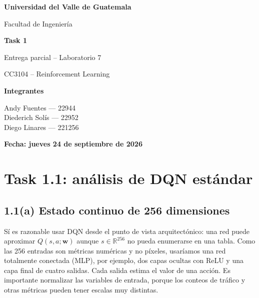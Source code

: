 \documentclass[11pt,a4paper]{article}
\newcommand{\integrantes}{Andy Fuentes --- 22944\\[0.2em]
Diederich Solís --- 22952\\[0.2em]
Diego Linares --- 221256}
\newcommand{\fechadeentrega}{jueves 24 de septiembre de 2026}
\begin{document}
\begin{titlepage}
\thispagestyle{empty}
\centering
\vspace*{2.3cm}
{\Large\bfseries Universidad del Valle de Guatemala\par}
\vspace{0.3cm}
{\large Facultad de Ingeniería\par}
\vspace{2.4cm}
{\Huge\bfseries Task 1\par}
\vspace{0.3cm}
{\Large Entrega parcial -- Laboratorio 7\par}
\vspace{0.45cm}
{\Large CC3104 -- Reinforcement Learning\par}
\vspace{2.2cm}
{\large\bfseries Integrantes\par}
\vspace{0.35cm}
{\large \integrantes\par}
\vfill
{\large\bfseries Fecha: \fechadeentrega\par}
\vspace{1.5cm}
\end{titlepage}

\section{Task 1.1: análisis de DQN estándar}

\subsection*{1.1(a) Estado continuo de 256 dimensiones}
Sí es razonable usar DQN desde el punto de vista arquitectónico: una red puede aproximar $Q(s,a;\mathbf{w})$ aunque $s\in\mathbb{R}^{256}$ no pueda enumerarse en una tabla. Como las 256 entradas son métricas numéricas y no píxeles, usaríamos una red totalmente conectada (MLP), por ejemplo, dos capas ocultas con ReLU y una capa final de cuatro salidas. Cada salida estima el valor de una acción. Es importante normalizar las variables de entrada, porque los conteos de tráfico y otras métricas pueden tener escalas muy distintas.
\end{document}
